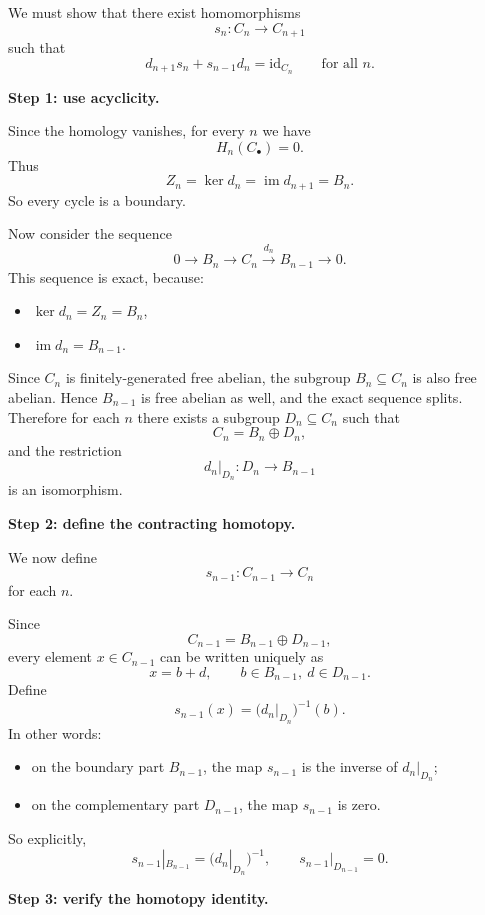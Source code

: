 \begin{solution}
We must show that there exist homomorphisms
\[
s_n:C_n\to C_{n+1}
\]
such that
\[
d_{n+1}s_n+s_{n-1}d_n=\mathrm{id}_{C_n}
\qquad\text{for all }n.
\]

\par

\textbf{Step 1: use acyclicity.}

Since the homology vanishes, for every \(n\) we have
\[
H_n(C_\bullet)=0.
\]
Thus
\[
Z_n=\ker d_n = \operatorname{im} d_{n+1}=B_n.
\]
So every cycle is a boundary.

Now consider the sequence
\[
0\longrightarrow B_n \longrightarrow C_n \xrightarrow{d_n} B_{n-1}\longrightarrow 0.
\]
This sequence is exact, because:
\begin{itemize}
	\item \(\ker d_n=Z_n=B_n\),
	\item \(\operatorname{im} d_n=B_{n-1}\).
\end{itemize}

Since \(C_n\) is finitely-generated free abelian, the subgroup \(B_n\subseteq C_n\) is also free abelian. Hence \(B_{n-1}\) is free abelian as well, and the exact sequence splits. Therefore for each \(n\) there exists a subgroup \(D_n\subseteq C_n\) such that
\[
C_n=B_n\oplus D_n,
\]
and the restriction
\[
d_n|_{D_n}:D_n\to B_{n-1}
\]
is an isomorphism.

\par

\textbf{Step 2: define the contracting homotopy.}

We now define
\[
s_{n-1}:C_{n-1}\to C_n
\]
for each \(n\).

Since
\[
C_{n-1}=B_{n-1}\oplus D_{n-1},
\]
every element \(x\in C_{n-1}\) can be written uniquely as
\[
x=b+d,
\qquad
b\in B_{n-1},\ d\in D_{n-1}.
\]
Define
\[
s_{n-1}(x)=\bigl(d_n|_{D_n}\bigr)^{-1}(b).
\]
In other words:
\begin{itemize}
	\item on the boundary part \(B_{n-1}\), the map \(s_{n-1}\) is the inverse of \(d_n|_{D_n}\);
	\item on the complementary part \(D_{n-1}\), the map \(s_{n-1}\) is zero.
\end{itemize}

So explicitly,
\[
s_{n-1}|_{B_{n-1}}=(d_n|_{D_n})^{-1},
\qquad
s_{n-1}|_{D_{n-1}}=0.
\]

\par

\textbf{Step 3: verify the homotopy identity.}


\end{solution}
